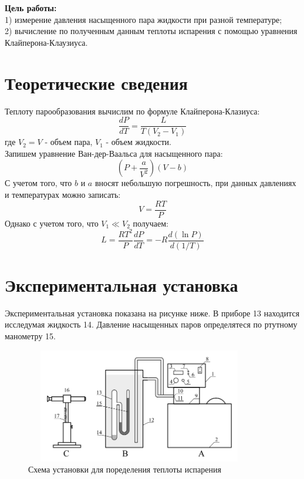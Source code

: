 \textbf{Цель работы:}\\
1) измерение давления насыщенного пара жидкости при разной температуре;\\
2) вычисление по полученным данным теплоты испарения с помощью уравнения 
Клайперона-Клаузиуса. \\\indent 

\section*{Теоретические сведения}
Теплоту парообразования вычислим по формуле Клайперона-Клазиуса:
\begin{equation}
    \frac{dP}{dT} = \frac{L}{T(V_2 - V_1)}
\end{equation}
где $V_2 = V$ - объем пара, $V_1$ - объем жидкости.\\\indent
Запишем уравнение Ван-дер-Ваальса для насыщенного пара:
\begin{equation}
    \left ( P + \frac{a}{V^2}\right )(V - b)
\end{equation}
С учетом того, что $b$ и $a$ вносят небольшую погрешность, 
при данных давлениях и температурах можно записать:
\begin{equation}
    V = \frac{RT}{P}
\end{equation}
Однако с учетом того, что $V_1 \ll V_2$ получаем:
\begin{equation}
    L = \frac{RT^2}{P}\frac{dP}{dT} = -R\frac{d(\ln P)}{d(1/T)}
\end{equation}

\section*{Экспериментальная установка}
Экспериментальная установка показана на рисунке ниже. В приборе 13 находится 
исследумая жидкость 14. Давление насыщенных паров определятеся по 
ртутному манометру 15. 
\newpage
\begin{figure}[t!]
    \centering
    \includegraphics[width=10cm,height=5cm]{setup.png}
    \caption{Схема установки для поределения теплоты испарения}
    \label{fig:setup}
\end{figure}


